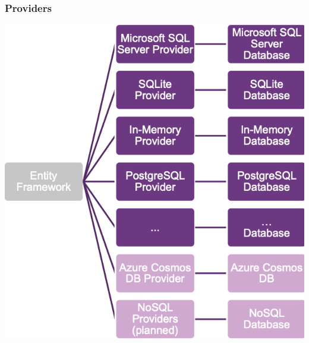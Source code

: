 \subsubsection{Providers}
\begin{center}
    \includegraphics[scale=.4]{graphic/efc/providers.png}
\end{center}
\vspace{-8pt}


